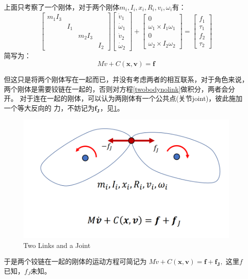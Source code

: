 \documentclass[lang=cn,newtx,10pt,scheme=chinese]{elegantbook}
\begin{document}
上面只考察了一个刚体，对于两个刚体$m_i, I_i, x_i, R_i, v_i, \omega_i$有：
\begin{equation}
  \label{twobodynolink}
  \left[\begin{array}{llll}
  m_1 I_3 & & & \\
  & I_1 & & \\
  & & m_2 I_3 & \\
  & & & I_2
  \end{array}\right]\left[\begin{array}{c}
  \dot{v}_1 \\
  \dot{\omega}_1 \\
  \dot{v}_2 \\
  \dot{\omega}_2
  \end{array}\right]+\left[\begin{array}{c}
  0 \\
  \omega_1 \times I_1 \omega_1 \\
  0 \\
  \omega_2 \times I_2 \omega_2
  \end{array}\right]=\left[\begin{array}{c}
  f_1 \\
  \tau_1 \\
  f_2 \\
  \tau_2
  \end{array}\right]
\end{equation}
简写为：
\begin{equation}
  M \dot{v}+C(\boldsymbol{x}, \boldsymbol{v})=\boldsymbol{f}
\end{equation}

但这只是将两个刚体写在一起而已，并没有考虑两者的相互联系，对于角色来说，
两个刚体是需要铰链在一起的，否则对方程\ref{twobodynolink}做积分，两者会分开。
对于连在一起的刚体，可以认为两刚体有一个公共点(关节joint)，彼此施加一个等大反向的
力，不妨记为$\boldsymbol{f_J}$，见\ref{fig:TwoLinksJoint}。
\begin{figure}[htbp]
  \centering
  \includegraphics[totalheight=1in]{"./image/TwoLinksJoint.png"}
  \caption{Two Links and a Joint} \label{fig:TwoLinksJoint}
\end{figure}
于是两个铰链在一起的刚体的运动方程可简记为
$M \dot{v}+C(\boldsymbol{x}, \boldsymbol{v})=\boldsymbol{f} + \boldsymbol{f_J},$
这里$f$已知，$f_J$未知。
\end{document}

